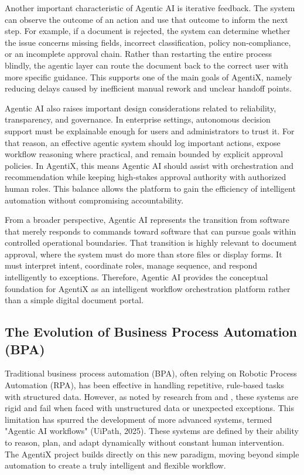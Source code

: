 \documentclass[12pt,oneside,openright,a4paper]{cpe-english-project}
\begin{document}
Another important characteristic of Agentic AI is iterative feedback.
The system can observe the outcome of an action and use that outcome to
inform the next step. For example, if a document is rejected, the system
can determine whether the issue concerns missing fields, incorrect
classification, policy non-compliance, or an incomplete approval chain.
Rather than restarting the entire process blindly, the agentic layer can
route the document back to the correct user with more specific guidance.
This supports one of the main goals of AgentiX, namely reducing delays
caused by inefficient manual rework and unclear handoff points.

Agentic AI also raises important design considerations related to
reliability, transparency, and governance. In enterprise settings,
autonomous decision support must be explainable enough for users and
administrators to trust it. For that reason, an effective agentic system
should log important actions, expose workflow reasoning where practical,
and remain bounded by explicit approval policies. In AgentiX, this means
Agentic AI should assist with orchestration and recommendation while
keeping high-stakes approval authority with authorized human roles. This
balance allows the platform to gain the efficiency of intelligent
automation without compromising accountability.

From a broader perspective, Agentic AI represents the transition from
software that merely responds to commands toward software that can pursue
goals within controlled operational boundaries. That transition is highly
relevant to document approval, where the system must do more than store
files or display forms. It must interpret intent, coordinate roles,
manage sequence, and respond intelligently to exceptions. Therefore,
Agentic AI provides the conceptual foundation for AgentiX as an
intelligent workflow orchestration platform rather than a simple digital
document portal.

\vspace{1em}

\subsection{The Evolution of Business Process Automation (BPA)}

Traditional business process automation (BPA), often relying on Robotic
Process Automation (RPA), has been effective in handling repetitive,
rule-based tasks with structured data. However, as noted by research
from
 and
, these systems are rigid and fail when faced with unstructured
data or unexpected exceptions. This limitation has spurred the
development of more advanced systems, termed "Agentic AI workflows"
(UiPath, 2025). These systems are defined by their ability to reason,
plan, and adapt dynamically without constant human intervention. The
AgentiX project builds directly on this new paradigm, moving beyond
simple automation to create a truly intelligent and flexible workflow.
\end{document}
